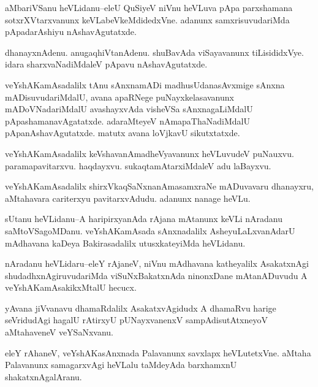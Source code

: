 \documentclass{article}
\begin{document}
\begin{mn}%
aMbariVSanu heVLidanu--eleU QuSiyeV niVnu heVLuva pApa parxshamana sotxrXVtarxvanunx 
keVLabeVkeMdidedxVne. adanunx samxrisuvudariMda pApadarAshiyu nAshavAgutatxde.
\end{mn}

\begin{mn}%
dhanayxnAdenu. anugaqhiVtanAdenu. shuBavAda viSayavanunx tiLisididxVye. idara 
sharxvaNadiMdaleV pApavu nAshavAgutatxde.
\end{mn}

\begin{mn}%
veYshAKamAsadalilx tAnu sAnxnamADi madhusUdanasAvxmige sAnxna mADisuvudariMdalU, avana 
apaRNege puNayxkelasavanunx mADoVNadariMdalU avashayxvAda visheVSa sAnxnagaLiMdalU 
pApashamanavAgatatxde. adaraMteyeV nAmapaThaNadiMdalU pApanAshavAgutatxde. matutx avana 
loVjkavU sikutxtatxde.
\end{mn}

\begin{mn}%
veYshAKamAsadalilx keVshavanAmadheVyavanunx heVLuvudeV puNauxvu. paramapavitarxvu. 
haqdayxvu. sukaqtamAtarxiMdaleV adu laBayxvu.
\end{mn}

\begin{mn}%
veYshAKamAsadalilx shirxVkaqSaNxnanAmasamxraNe mADuvavaru dhanayxru, aMtahavara cariterxyu 
pavitarxvAdudu. adanunx nanage heVLu.
\end{mn}

\begin{mn}%
sUtanu heVLidanu--A haripirxyanAda rAjana mAtanunx keVLi nAradanu saMtoVSagoMDanu. 
veYshAKamAsada sAnxnadalilx AsheyuLaLxvanAdarU mAdhavana kaDeya Bakirasadalilx 
utusxkateyiMda heVLidanu.
\end{mn}

\begin{mn}%
nAradanu heVLidaru--eleY rAjaneV, niVnu mAdhavana katheyalilx AsakatxnAgi 
shudadhxnAgiruvudariMda viSuNxBakatxnAda ninonxDane mAtanADuvudu A veYshAKamAsakikxMtalU 
hecucx.
\end{mn}

\begin{mn}%
yAvana jiVvanavu dhamaRdalilx AsakatxvAgidudx A dhamaRvu harige seVridudAgi hagalU 
rAtirxyU pUNayxvanenxV sampAdisutAtxneyoV aMtahaveneV veYSaNxvanu.
\end{mn}

\begin{mn}%
eleY rAhaneV, veYshAKasAnxnada Palavanunx savxlapx heVLutetxVne. aMtaha Palavanunx 
samagarxvAgi heVLalu taMdeyAda barxhamxnU shakatxnAgalAranu.
\end{mn}
\end{document}
